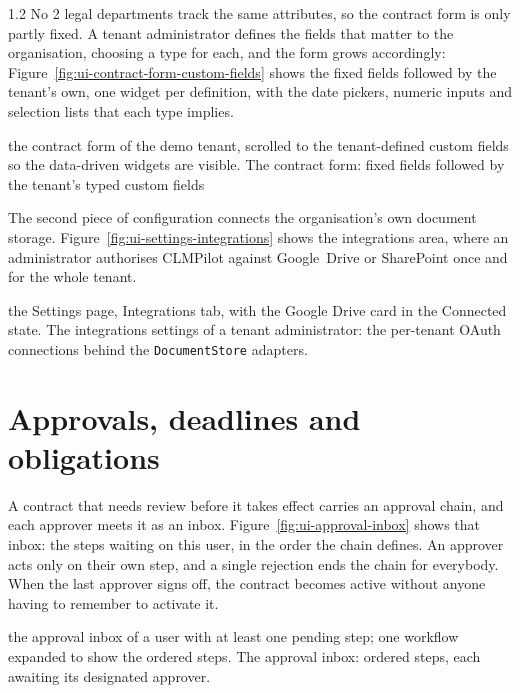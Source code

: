 \begin{spacing}{1.2}
No 2 legal departments track the same attributes, so the contract form
is only partly fixed. A tenant administrator defines the fields that
matter to the organisation, choosing a type for each, and the form grows
accordingly: Figure~\ref{fig:ui-contract-form-custom-fields} shows the
fixed fields followed by the tenant's own, one widget per definition,
with the date pickers, numeric inputs and selection lists that each type
implies. 

  {the contract form of the demo tenant, scrolled to the
   tenant-defined custom fields so the data-driven widgets are
   visible.}
  {The contract form: fixed fields followed by the tenant's typed
   custom fields}

The second piece of configuration connects the organisation's own
document storage. Figure~\ref{fig:ui-settings-integrations} shows the
integrations area, where an administrator authorises CLMPilot against
Google~Drive or SharePoint once and for the whole tenant.

  {the Settings page, Integrations tab, with the Google Drive card in
   the Connected state.}
  {The integrations settings of a tenant administrator: the per-tenant
   OAuth connections behind the \texttt{DocumentStore} adapters.}

\section{Approvals, deadlines and obligations}
\label{sec:walk-workflow}

A contract that needs review before it takes effect carries an approval
chain, and each approver meets it as an inbox.
Figure~\ref{fig:ui-approval-inbox} shows that inbox: the steps waiting
on this user, in the order the chain defines. An approver acts only on
their own step, and a single rejection ends the chain for everybody. When
the last approver signs off, the contract becomes active without anyone
having to remember to activate it.

  {the approval inbox of a user with at least one pending step; one
   workflow expanded to show the ordered steps.}
  {The approval inbox: ordered steps, each awaiting its designated
   approver.}


\end{spacing}
